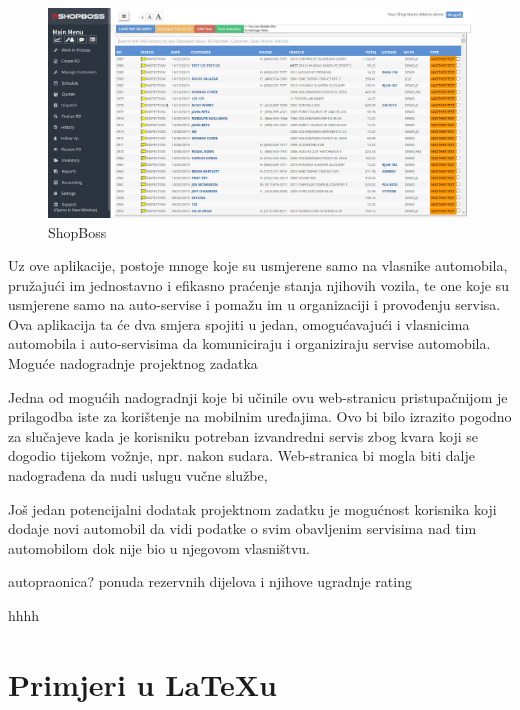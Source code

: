 		\begin{figure}[H]
			\includegraphics[scale=0.3]{slike/shopboss.PNG}
			\centering
			\caption{ShopBoss}
			\label{fig:idk1}
		\end{figure}
		
		Uz ove aplikacije, postoje mnoge koje su usmjerene samo na vlasnike automobila, pružajući im jednostavno i efikasno praćenje stanja njihovih vozila, te one koje su usmjerene samo na auto-servise i pomažu im u organizaciji i provođenju servisa. Ova aplikacija ta će dva smjera spojiti u jedan, omogućavajući i vlasnicima automobila i auto-servisima da komuniciraju i organiziraju servise automobila. \\
		
			\Large Moguće nadogradnje projektnog zadatka
		
		\normalsize Jedna od mogućih nadogradnji koje bi učinile ovu web-stranicu pristupačnijom je prilagodba iste za korištenje na mobilnim uređajima. Ovo bi bilo izrazito pogodno za slučajeve kada je korisniku potreban izvandredni servis zbog kvara koji se dogodio tijekom vožnje, npr. nakon sudara. Web-stranica bi mogla biti dalje nadograđena da nudi uslugu vučne službe,
		
		Još jedan potencijalni dodatak projektnom zadatku je mogućnost korisnika koji dodaje novi automobil da vidi podatke o svim obavljenim servisima nad tim automobilom dok nije bio u njegovom vlasništvu.
		
		
		
		
		autopraonica?
		ponuda rezervnih dijelova i njihove ugradnje
		rating
		
		
		
		
		
		hhhh\\
		\eject
		
		\section{Primjeri u LaTeXu}
		

